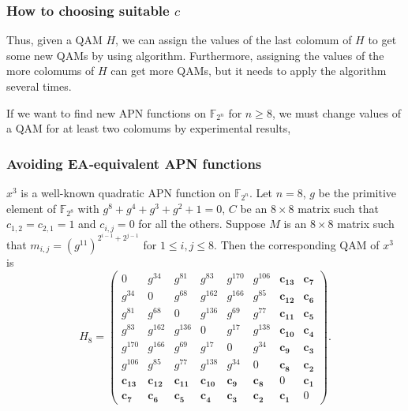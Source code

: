 \documentclass[
    aspectratio=169,                   %
]{beamer}
\newcommand{\F}{\mathbb{F}}
\begin{document}
    \begin{frame}
        \frametitle{How to choosing suitable $ c $}

        Thus, given a QAM $ H $, we can assign the values of the last colomum of $ H $ to get some new QAMs by
        using algorithm. Furthermore,  assigning the values of the more colomums of $ H $ can get more QAMs,
        but it needs to apply the algorithm several times. 

        If we want to find new APN functions on $ \F_{2^n} $ for $ n\ge 8 $, 
        we must change values of a QAM for at least  two colomums by experimental results, 
    \end{frame}

    \begin{frame}
        \frametitle{Avoiding EA‑equivalent APN functions}
    
        \begin{example}
        $ x^3 $ is a well-known quadratic APN function on $ \F_{2^n} $. Let $ n=8 $, $ g $ be the primitive element of $ \F_{2^8} $ with 
        $ g^8+g^4+g^3+g^2+1=0 $, $ C $ be an $ 8\times 8 $ matrix such that $ c_{1,2}=c_{2,1}=1 $ and $ c_{i,j}=0 $ for all the others.
        Suppose $ M $ is an $ 8\times 8 $ matrix such that $ m_{i,j}=(g^{11})^{2^{i-1}+2^{j-1}} $ for $ 1\le i,j\le 8 $. Then the corresponding QAM
        of $ x^3 $ is  
            \[H_{8}=\left(\begin{array}{cccccccc}
                0 & g^{34} & g^{81} & g^{83} & g^{170} & g^{106} & \mathbf{c}_{\mathbf{1 3}} & \mathbf{c}_{\mathbf{7}} \\
                g^{34} & 0 & g^{68} & g^{162} & g^{166} & g^{85} & \mathbf{c}_{\mathbf{1 2}} & \mathbf{c}_{\mathbf{6}} \\
                g^{81} & g^{68} & 0 & g^{136} & g^{69} & g^{77} & \mathbf{c}_{\mathbf{1 1}} & \mathbf{c}_{\mathbf{5}} \\
                g^{83} & g^{162} & g^{136} & 0 & g^{17} & g^{138} & \mathbf{c}_{\mathbf{1 0}} & \mathbf{c}_{\mathbf{4}} \\
                g^{170} & g^{166} & g^{69} & g^{17} & 0 & g^{34} & \mathbf{c}_{\mathbf{9}} & \mathbf{c}_{\mathbf{3}} \\
                g^{106} & g^{85} & g^{77} & g^{138} & g^{34} & 0 & \mathbf{c}_{\mathbf{8}} & \mathbf{c}_{\mathbf{2}} \\
                \mathbf{c}_{\mathbf{1 3}} & \mathbf{c}_{\mathbf{1 2}} & \mathbf{c}_{\mathbf{1 1}} & \mathbf{c}_{\mathbf{1 0}} & \mathbf{c}_{\mathbf{9}} & \mathbf{c}_{\mathbf{8}} & 0 & \mathbf{c}_{\mathbf{1}} \\
                \mathbf{c}_{\mathbf{7}} & \mathbf{c}_{\mathbf{6}} & \mathbf{c}_{\mathbf{5}} & \mathbf{c}_{\mathbf{4}} & \mathbf{c}_{\mathbf{3}} & \mathbf{c}_{\mathbf{2}} & \mathbf{c}_{\mathbf{1}} & 0
            \end{array}\right).\]
        \end{example}
        
    \end{frame}
        
\end{document}
